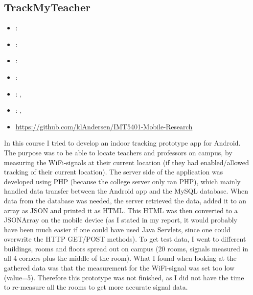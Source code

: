 \subsection{TrackMyTeacher}
\label{sec:trackmyteacher}
\begin{itemize} 
	\item {}: 
	\item {}: 
	\item {}: 
	\item {}: 
	\item {}: , 
	\item {}: , 
	\item {} \url{https://github.com/klAndersen/IMT5401-Mobile-Research}
\end{itemize} 
In this course I tried to develop an indoor tracking prototype app for Android. The purpose was to
be able to locate teachers and professors on campus, by measuring the WiFi-signals at their
current location (if they had enabled/allowed tracking of their current location).
\vspace{0.5em}\newline
The server side of the application was developed using PHP (because the college server only ran
PHP), which mainly handled data transfer between the Android app and the MySQL database.
When data from the database was needed, the server retrieved the data, added it to an array as 
JSON and printed it as HTML. This HTML was then converted to a JSONArray on the mobile
device (as I stated in my report, it would probably have been much easier if one could have used
Java Servlets, since one could overwrite the HTTP GET/POST methods).
\vspace{0.5em}\newline
To get test data, I went to different buildings, rooms and floors spread out on campus (20 rooms,
signals measured in all 4 corners plus the middle of the room). What I found when looking at the
gathered data was that the measurement for the WiFi-signal was set too low (value=5). Therefore
this prototype was not finished, as I did not have the time to re-measure all the rooms to get more
accurate signal data.

